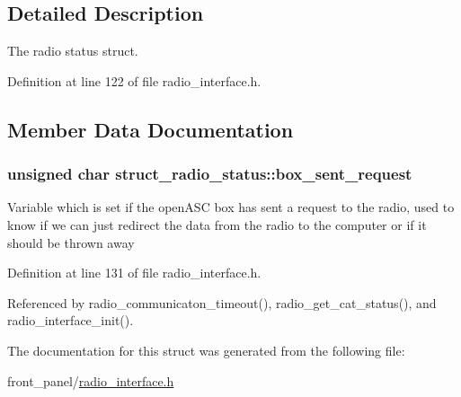\subsection{Detailed Description}
The radio status struct. 

Definition at line 122 of file radio\_\-interface.h.

\subsection{Member Data Documentation}
\hypertarget{structstruct__radio__status_b4b33389742d5abd41dfdc7cb8df71b8}{
\subsubsection[{box\_\-sent\_\-request}]{\setlength{\rightskip}{0pt plus 5cm}unsigned char {\bf struct\_\-radio\_\-status::box\_\-sent\_\-request}}}
\label{structstruct__radio__status_b4b33389742d5abd41dfdc7cb8df71b8}


Variable which is set if the openASC box has sent a request to the radio, used to know if we can just redirect the data from the radio to the computer or if it should be thrown away 

Definition at line 131 of file radio\_\-interface.h.

Referenced by radio\_\-communicaton\_\-timeout(), radio\_\-get\_\-cat\_\-status(), and radio\_\-interface\_\-init().

The documentation for this struct was generated from the following file:\begin{CompactItemize}
\item 
front\_\-panel/\hyperlink{radio__interface_8h}{radio\_\-interface.h}\end{CompactItemize}
